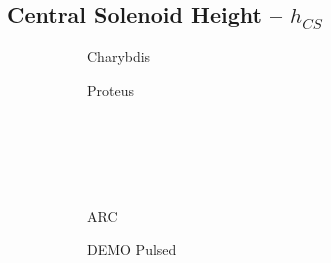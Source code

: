 \clearpage

\newpage

\subsection*{ Central Solenoid Height -- $h_{CS}$ }
  \label{subsection:scan_h_CS}

\begin{figure*}[h!]
    \centering
    \hfill
    \begin{subfigure}[t]{0.45\textwidth}
        \centering
    \begin{adjustbox}{width=\textwidth}
      \Large
      
    \end{adjustbox}
        \caption{Charybdis}
    \end{subfigure}
    \hfill
    \begin{subfigure}[t]{0.45\textwidth}
        \centering
    \begin{adjustbox}{width=\textwidth}
      \Large
      
    \end{adjustbox}
        \caption{Proteus}
    \end{subfigure}
    \hfill \hfill ~\\ ~\\ ~\\ ~\\
    \hfill
    \begin{subfigure}[t]{0.45\textwidth}
        \centering
    \begin{adjustbox}{width=\textwidth}
      \Large
      
    \end{adjustbox}
        \caption{ARC}
    \end{subfigure}
    \hfill
    \begin{subfigure}[t]{0.45\textwidth}
        \centering
    \begin{adjustbox}{width=\textwidth}
      \Large
      
    \end{adjustbox}
        \caption{DEMO Pulsed}
    \end{subfigure}
    \hfill \hfill ~\\ ~\\ ~\\ ~\\
    \hfill
    \begin{subfigure}[t]{0.45\textwidth}
        \centering
    \begin{adjustbox}{width=\textwidth}

\end{adjustbox}
\end{subfigure}
\end{figure*}

